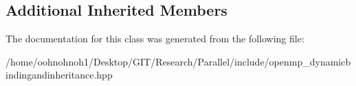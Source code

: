 \subsection*{Additional Inherited Members}


The documentation for this class was generated from the following file\+:\begin{DoxyCompactItemize}
\item 
/home/oohnohnoh1/\+Desktop/\+G\+I\+T/\+Research/\+Parallel/include/openmp\+\_\+dynamicbindingandinheritance.\+hpp\end{DoxyCompactItemize}
